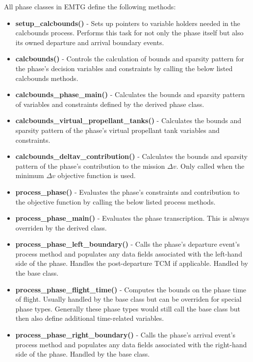 All phase classes in EMTG define the following methods:
\begin{itemize}
	\item \textbf{setup\_calcbounds()} - Sets up pointers to variable holders needed in the calcbounds process. Performs this task for not only the phase itself but also its owned departure and arrival boundary events.
	\item \textbf{calcbounds()} - Controls the calculation of bounds and sparsity pattern for the phase's decision variables and constraints by calling the below listed calcbounds methods.
	
	\item \textbf{calcbounds\_phase\_main()} - Calculates the bounds and sparsity pattern of variables and constraints defined by the derived phase class.
	
	\item \textbf{calcbounds\_virtual\_propellant\_tanks()} - Calculates the bounds and sparsity pattern of the phase's virtual propellant tank variables and constraints.
	
	\item \textbf{calcbounds\_deltav\_contribution()} - Calculates the bounds and sparsity pattern of the phase's contribution to the mission $\Delta v$. Only called when the minimum $\Delta v$ objective function is used.
	
	\item \textbf{process\_phase()} - Evaluates the phase's constraints and contribution to the objective function by calling the below listed process methods.

	\item \textbf{process\_phase\_main()} - Evaluates the phase transcription. This is always overriden by the derived class.
	
	\item \textbf{process\_phase\_left\_boundary()} - Calls the phase's departure event's process method and populates any data fields associated with the left-hand side of the phase. Handles the post-departure TCM if applicable. Handled by the base class.
	
	\item \textbf{process\_phase\_flight\_time()} - Computes the bounds on the phase time of flight. Usually handled by the base class but can be overriden for special phase types. Generally these phase types would still call the base class but then also define additional time-related variables.
	
	\item \textbf{process\_phase\_right\_boundary()} - Calls the phase's arrival event's process method and populates any data fields associated with the right-hand side of the phase. Handled by the base class.
	

\end{itemize}
